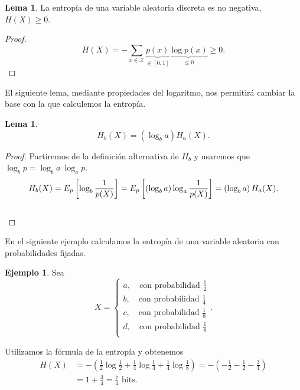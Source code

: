 \documentclass[12pt,a4paper]{report} %
\theoremstyle{definition}
\newtheorem{lemma}[theorem]{Lema}
\newtheorem{example}[theorem]{Ejemplo}
\begin{document}
\begin{lemma} La entropía de una variable aleatoria discreta es no negativa, $H(X) \ge 0$.
\end{lemma}
\begin{proof}
  \[H(X) = - \sum_{x \in \mathcal{X}}\underbrace{p(x)}_{\in [0,1]}\underbrace{\log p(x)}_{\leq 0} \ge 0.\]

\end{proof}

El siguiente lema, mediante propiedades del logaritmo, nos permitirá cambiar la base con la que calculemos la entropía.\\

\begin{lemma}\[H_b(X) = (\log_ba) H_a(X).\]
\end{lemma}
\begin{proof}
  Partiremos de la definición alternativa de $H_b$ y usaremos que $\log_bp = \log_ba\ \log_ap$.
  \[
  H_b(X) = \relax{E}_p \left[\log_b \frac{1}{p(X)}\right ] = \relax{E}_p \left [ \left ( \log_b a \right )\log_a \frac{1}{p(X)} \right ] = \left ( \log_b{a} \right ) H_a(X).
  \]\\[-10pt]
\end{proof}

En el siguiente ejemplo calculamos la entropía de una variable aleatoria con probabilidades fijadas.
\begin{example}
  Sea  \[X = 
     \begin{cases}
       a, \quad\text{con probabilidad } \frac{1}{2}\\
       b, \quad\text{con probabilidad } \frac{1}{4} \\
       c, \quad\text{con probabilidad } \frac{1}{8} \\
       d, \quad\text{con probabilidad } \frac{1}{8} \\
     \end{cases}.\]

     Utilizamos la fórmula de la entropía y obtenemos
     \begin{align*}
       H(X) &= - \left (\frac{1}{2} \log \frac{1}{2} + \frac{1}{4} \log \frac{1}{4} + \frac{1}{4} \log \frac{1}{8} \right ) = - \left (-\frac{1}{2} - \frac{1}{2} - \frac{3}{4} \right )\\[5pt] &= 1 + \frac{3}{4} = \frac{7}{4} \text{ bits}.\\
       \end{align*}
\end{example}
\end{document}
